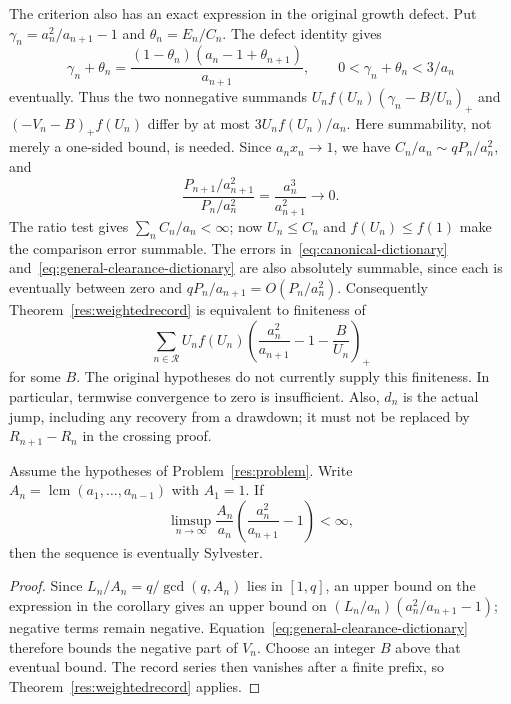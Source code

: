 \documentclass[11pt]{article}
\begin{document}
The criterion also has an exact expression in the original growth defect.
Put $\gamma_n=a_n^2/a_{n+1}-1$ and $\theta_n=E_n/C_n$. The defect identity
gives
\[
 \gamma_n+\theta_n=
 \frac{(1-\theta_n)(a_n-1+\theta_{n+1})}{a_{n+1}},
 \qquad 0<\gamma_n+\theta_n<3/a_n
\]
eventually. Thus the two nonnegative summands
$U_nf(U_n)(\gamma_n-B/U_n)_+$ and $(-V_n-B)_+f(U_n)$ differ by at most
$3U_nf(U_n)/a_n$. Here summability, not merely a one-sided bound, is
needed. Since $a_nx_n\to1$, we have $C_n/a_n\sim qP_n/a_n^2$, and
\[
 \frac{P_{n+1}/a_{n+1}^{2}}{P_n/a_n^{2}}
 =\frac{a_n^3}{a_{n+1}^{2}}\longrightarrow0.
\]
The ratio test gives $\sum_nC_n/a_n<\infty$; now $U_n\le C_n$ and
$f(U_n)\le f(1)$ make the comparison error summable.
The errors in~\eqref{eq:canonical-dictionary}
and~\eqref{eq:general-clearance-dictionary} are also absolutely summable,
since each is eventually between zero and $qP_n/a_{n+1}=O(P_n/a_n^2)$.
Consequently Theorem~\ref{res:weightedrecord} is equivalent to finiteness of
\begin{equation}\label{eq:weightedgrowth}
 \sum_{n\in\mathcal R}U_nf(U_n)
 \left(\frac{a_n^2}{a_{n+1}}-1-\frac B{U_n}\right)_+
\end{equation}
for some $B$. The original hypotheses do not currently supply this
finiteness. In particular, termwise convergence to zero is insufficient.
Also, $d_n$ is the actual jump, including any recovery from a drawdown; it
must not be replaced by $R_{n+1}-R_n$ in the crossing proof.

\begin{corollary}\label{res:lcmbounded}
Assume the hypotheses of Problem~\ref{res:problem}. Write
$A_n=\operatorname{lcm}(a_1,\ldots,a_{n-1})$ with $A_1=1$. If
\[
 \limsup_{n\to\infty}\frac{A_n}{a_n}
 \left(\frac{a_n^2}{a_{n+1}}-1\right)<\infty,
\]
then the sequence is eventually Sylvester.
\end{corollary}

\begin{proof}
Since $L_n/A_n=q/\gcd(q,A_n)$ lies in $[1,q]$, an upper bound on the
expression in the corollary gives an upper bound on
$(L_n/a_n)(a_n^2/a_{n+1}-1)$; negative terms remain negative.
Equation~\eqref{eq:general-clearance-dictionary} therefore bounds the
negative part of $V_n$. Choose an integer $B$ above
that eventual bound. The record series then vanishes after a finite prefix,
so Theorem~\ref{res:weightedrecord} applies.
\end{proof}
\end{document}
